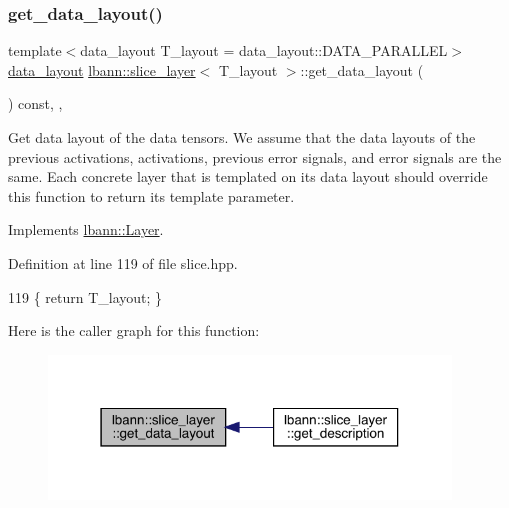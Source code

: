 \subsubsection{\texorpdfstring{get\+\_\+data\+\_\+layout()}{get\_data\_layout()}}
{\footnotesize\ttfamily template$<$data\+\_\+layout T\+\_\+layout = data\+\_\+layout\+::\+D\+A\+T\+A\+\_\+\+P\+A\+R\+A\+L\+L\+EL$>$ \\
\hyperlink{base_8hpp_a786677cbfb3f5677b4d84f3056eb08db}{data\+\_\+layout} \hyperlink{classlbann_1_1slice__layer}{lbann\+::slice\+\_\+layer}$<$ T\+\_\+layout $>$\+::get\+\_\+data\+\_\+layout (\begin{DoxyParamCaption}{ }\end{DoxyParamCaption}) const\hspace{0.3cm}{\ttfamily [inline]}, {\ttfamily [override]}, {\ttfamily [virtual]}}

Get data layout of the data tensors. We assume that the data layouts of the previous activations, activations, previous error signals, and error signals are the same. Each concrete layer that is templated on its data layout should override this function to return its template parameter. 

Implements \hyperlink{classlbann_1_1Layer_a5dfb66e81fc085997402a5e2241316bd}{lbann\+::\+Layer}.



Definition at line 119 of file slice.\+hpp.


\begin{DoxyCode}
119 \{ \textcolor{keywordflow}{return} T\_layout; \}
\end{DoxyCode}
Here is the caller graph for this function\+:\nopagebreak
\begin{figure}[H]
\begin{center}
\leavevmode
\includegraphics[width=303pt]{classlbann_1_1slice__layer_a5121b600d26654707289726e84c0eed9_icgraph}
\end{center}
\end{figure}
\mbox{\label{classlbann_1_1slice__layer_aa61c1f449a9f741f523921129dfb88e5}} 
